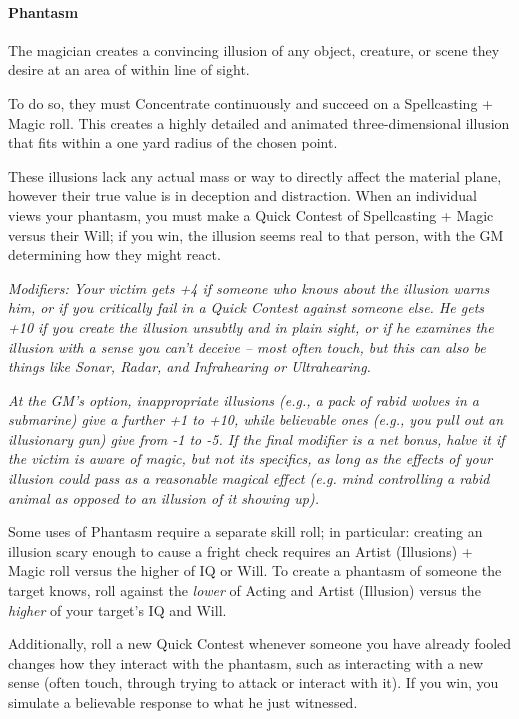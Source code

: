 \begin{multicols*}{3}
	\paragraph{Phantasm}
	
	The magician creates a convincing illusion of any object, creature, or scene they desire at an area of within line of sight.
	
	To do so, they must Concentrate continuously and succeed on a Spellcasting + Magic roll. This creates a highly detailed and animated three-dimensional illusion that fits within a one yard radius of the chosen point.
	
	These illusions lack any actual mass or way to directly affect the material plane, however their true value is in deception and distraction. When an individual views your phantasm, you must make a Quick Contest of Spellcasting + Magic versus their Will; if you win, the illusion seems real to that person, with the GM determining how they might react.
	
	\textcolor{NavyBlue}{\textit{Modifiers: Your victim gets +4 if someone who knows about the illusion warns him, or if you critically fail in a Quick Contest against someone else. He gets +10 if you create the illusion unsubtly and in plain sight, or if	he examines the illusion with a sense you can’t deceive – most often touch, but this can also be things like Sonar, Radar, and Infrahearing or Ultrahearing. }}
			
	\textcolor{NavyBlue}{\textit{At the GM’s option, inappropriate illusions (e.g., a pack of rabid wolves in a submarine) give a further +1 to +10, while believable ones (e.g., you pull out an illusionary gun) give from -1 to -5. If the final modifier is a net bonus, halve it if the victim is aware of magic, but not its specifics, as long as the effects of your illusion could pass as a reasonable magical effect (e.g. mind controlling a rabid animal as opposed to an illusion of it showing up).}}
	
	Some uses of Phantasm require a separate skill roll; in particular: creating an illusion scary enough to cause a fright check requires an Artist (Illusions) + Magic roll versus the higher of IQ or Will. To create a phantasm of someone the target knows, roll against the \textit{lower} of Acting and Artist (Illusion) versus the \textit{higher} of your target's IQ and Will.
	
	Additionally, roll a new Quick Contest whenever someone you have already fooled changes how they interact with the phantasm, such as interacting with a new sense (often touch, through trying to attack or interact with it). If you win, you simulate a believable response to what he just witnessed.
	

\end{multicols*}
